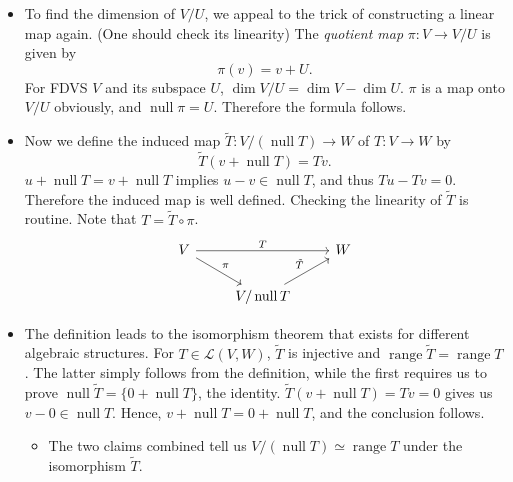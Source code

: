 \documentclass{article}
\newcommand{\n}{\operatorname{null}}
\renewcommand{\r}{\operatorname{range}}
\renewcommand{\d}{\dim}
\newcommand{\LVW}{\mathcal{L}(V,W)}
\begin{document}
\begin{itemize}
\begin{itemize}
    \end{itemize}
    \item To find the dimension of $V/U$, we appeal to the trick of constructing a linear map again. (One should check its linearity) The \textit{quotient map} $\pi: V \to V/U$ is given by $$\pi(v) = v+U.$$
    For FDVS $V$ and its subspace $U$, $\d V/U = \d V - \d U$. $\pi$ is a map onto $V/U$ obviously, and $\n \pi = U$. Therefore the formula follows.
    \item Now we define the induced map $\tilde{T}: V/(\n T) \to W$ of $T: V \to W$ by $$\tilde{T}(v+\n T) = Tv.$$ $u + \n T = v + \n T$ implies $u - v \in \n T$, and thus $Tu-Tv = 0$. Therefore the induced map is well defined. Checking the linearity of $\tilde{T}$ is routine. Note that $T = \tilde{T} \circ \pi$.
    \begin{equation*}
            \begin{tikzcd}
                V \arrow[rr,"T"] \arrow[dr,"\pi"] && W \\
                & {V/\n T} \arrow[ur,"\tilde{T}"]
            \end{tikzcd}
        \end{equation*}
    \item The definition leads to the isomorphism theorem that exists for different algebraic structures. For $T \in \LVW$, $\tilde{T}$ is injective and $\r \tilde{T} = \r T$. The latter simply follows from the definition, while the first requires us to prove $\n \tilde{T} = \{0+\n T\}$, the identity. $\tilde{T}(v+\n T) = Tv = 0$ gives us $v-0 \in \n T$. Hence, $v+\n T = 0+\n T$, and the conclusion follows.
        \begin{itemize}
            \item The two claims combined tell us $V/(\n T) \simeq \r T$ under the isomorphism $\tilde{T}$.
        \end{itemize}
    \end{itemize}
    
\end{document}
